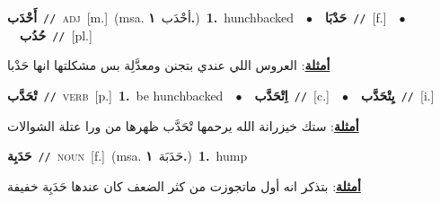 \documentclass[10pt,a4paper,twoside]{article} %
\begin{document}
\begin{multicols}{2}
{\setlength\topsep{0pt}\textbf{\foreignlanguage{arabic}{أَحْدَب}}\ {\color{gray}\texttt{//}\color{black}}\ \textsc{adj}\ [m.]\ \color{gray}(msa. \foreignlanguage{arabic}{أحْدَب}~\foreignlanguage{arabic}{\textbf{١.}})\color{black}\ \textbf{1.}~hunchbacked\ \ $\bullet$\ \ \setlength\topsep{0pt}\textbf{\foreignlanguage{arabic}{حَدْبَا}}\ {\color{gray}\texttt{//}\color{black}}\ [f.]\ \ $\bullet$\ \ \setlength\topsep{0pt}\textbf{\foreignlanguage{arabic}{حُدُب}}\ {\color{gray}\texttt{//}\color{black}}\ [pl.]\  \begin{flushright}\color{gray}\foreignlanguage{arabic}{\textbf{\underline{\foreignlanguage{arabic}{أمثلة}}}: العروس اللي عندي بتجنن ومعدَّلِة بس مشكلتها انها حَدْبا}\end{flushright}\color{black}} \vspace{2mm}

{\setlength\topsep{0pt}\textbf{\foreignlanguage{arabic}{تْحَدَّب}}\ {\color{gray}\texttt{//}\color{black}}\ \textsc{verb}\ [p.]\ \textbf{1.}~be hunchbacked\ \ $\bullet$\ \ \setlength\topsep{0pt}\textbf{\foreignlanguage{arabic}{اِتْحَدَّب}}\ {\color{gray}\texttt{//}\color{black}}\ [c.]\ \ $\bullet$\ \ \setlength\topsep{0pt}\textbf{\foreignlanguage{arabic}{يِتْحَدَّب}}\ {\color{gray}\texttt{//}\color{black}}\ [i.]\  \begin{flushright}\color{gray}\foreignlanguage{arabic}{\textbf{\underline{\foreignlanguage{arabic}{أمثلة}}}: ستك خيزرانة الله يرحمها تْحَدَّب ظهرها من ورا عتلة الشوالات}\end{flushright}\color{black}} \vspace{2mm}

{\setlength\topsep{0pt}\textbf{\foreignlanguage{arabic}{حَدَبِة}}\ {\color{gray}\texttt{//}\color{black}}\ \textsc{noun}\ [f.]\ \color{gray}(msa. \foreignlanguage{arabic}{حَدَبَة}~\foreignlanguage{arabic}{\textbf{١.}})\color{black}\ \textbf{1.}~hump\  \begin{flushright}\color{gray}\foreignlanguage{arabic}{\textbf{\underline{\foreignlanguage{arabic}{أمثلة}}}: بتذكر انه أول ماتجوزت من كثر الضعف كان عندها حَدَبِة خفيفة}\end{flushright}\color{black}} \vspace{2mm}


\end{multicols}
\end{document}
